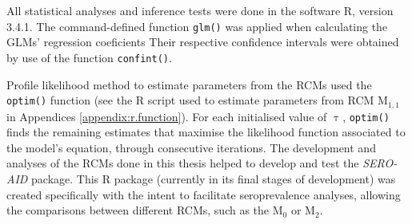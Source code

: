 All statistical analyses and inference tests were done in the software R, version 3.4.1.
The command-defined function \texttt{glm()} was applied when calculating the GLMs' regression coeficients
Their respective confidence intervals were obtained by use of the function \texttt{confint()}.

\enlargethispage{\baselineskip}
Profile likelihood method to estimate parameters from the RCMs used the \texttt{optim()} function (see the R script used to estimate parameters from RCM M$_{1,1}$ in Appendices \ref{appendix:r.function}).
For each initialised value of $\uptau$, \texttt{optim()} finds the remaining estimates that maximise the likelihood function associated to the model's equation, through consecutive iterations.
The development and analyses of the RCMs done in this thesis helped to develop and test the \emph{SERO-AID} package.
This R package (currently in its final stages of development) was created specifically with the intent to facilitate seroprevalence analyses, allowing the comparisons between different RCMs, such as the M$_0$ or M$_2$.